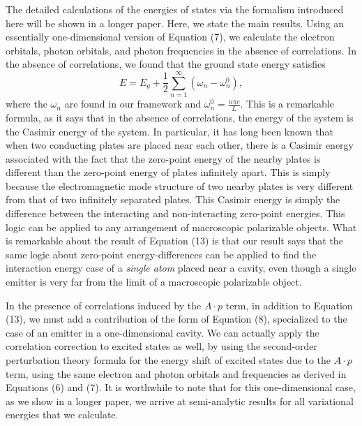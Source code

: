 \documentclass[aps,prl,twocolumn,
	groupedaddress,superscriptaddress,
	amsfonts,amssymb,amsmath,floatfix,
	citeautoscript]{revtex4-1}
\begin{document}
The detailed calculations of the energies of states via the formalism introduced here will be shown in a longer paper. Here, we state the main results. Using an essentially one-dimensional version of Equation (7), we calculate the electron orbitals, photon orbitals, and photon frequencies in the absence of correlations. In the absence of correlations, we found that the ground state energy satisfies
\begin{equation}
E = E_g + \frac{1}{2}\sum\limits_{n=1}^{\infty}(\omega_n - \omega_n^0),
\end{equation}
where the $\omega_n$ are found in our framework and $\omega_n^0 = \frac{n\pi c}{L}$. This is a remarkable formula, as it says that in the absence of correlations, the energy of the system is the Casimir energy of the system. In particular, it has long been known that when two conducting plates are placed near each other, there is a Casimir energy associated with the fact that the zero-point energy of the nearby plates is different than the zero-point energy of plates infinitely apart. This is simply because the electromagnetic mode structure of two nearby plates is very different from that of two infinitely separated plates. This Casimir energy is simply the difference between the interacting and non-interacting zero-point energies. This logic can be applied to any arrangement of macroscopic polarizable objects. What is remarkable about the result of Equation (13) is that our result says that the same logic about zero-point energy-differences can be applied to find the interaction energy case of a \textit{single atom} placed near a cavity, even though a single emitter is very far from the limit of a macroscopic polarizable object. 

In the presence of correlations induced by the $A \cdot p$ term, in addition to Equation (13), we must add a contribution of the form of Equation (8), specialized to the case of an emitter in a one-dimensional cavity. We can actually apply the correlation correction to excited states as well, by using the second-order perturbation theory formula for the energy shift of excited states due to the $A \cdot p$ term, using the same electron and photon orbitals and frequencies as derived in Equations (6) and (7). It is worthwhile to note that for this one-dimensional case, as we show in a longer paper, we arrive at semi-analytic results for all variational energies that we calculate.
\end{document}
